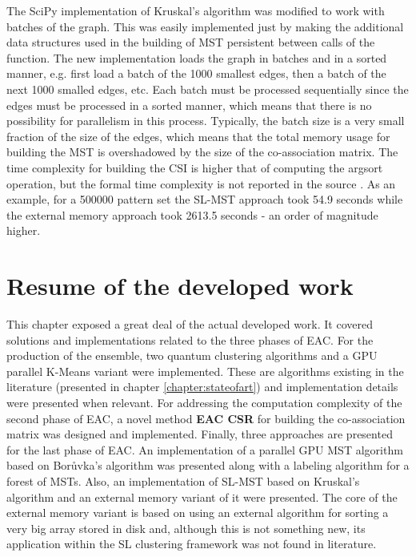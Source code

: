 The SciPy implementation of Kruskal's algorithm was modified to work with batches of the graph.
This was easily implemented just by making the additional data structures used in the building of MST persistent between calls of the function.
The new implementation loads the graph in batches and in a sorted manner, e.g. first load a batch of the 1000 smallest edges, then a batch of the next 1000 smalled edges, etc.
Each batch must be processed sequentially since the edges must be processed in a sorted manner, which means that there is no possibility for parallelism in this process.
Typically, the batch size is a very small fraction of the size of the edges, which means that the total memory usage for building the MST is overshadowed by the size of the co-association matrix.
The time complexity for building the CSI is higher that of computing the argsort operation, but the formal time complexity is not reported in the source \cite{AltetiAbad2007}.
As an example, for a 500000 pattern set the SL-MST approach took 54.9 seconds while the external memory approach took 2613.5 seconds - an order of magnitude higher.

\section{Resume of the developed work}

This chapter exposed a great deal of the actual developed work.
It covered solutions and implementations related to the three phases of EAC.
For the production of the ensemble, two quantum clustering algorithms and a GPU parallel K-Means variant were implemented.
These are algorithms existing in the literature (presented in chapter \ref{chapter:stateofart}) and implementation details were presented when relevant.
For addressing the computation complexity of the second phase of EAC, a novel method \textbf{EAC CSR} for building the co-association matrix was designed and implemented.
Finally, three approaches are presented for the last phase of EAC.
An implementation of a parallel GPU MST algorithm based on Borůvka's algorithm was presented along with a labeling algorithm for a forest of MSTs.
Also, an implementation of SL-MST based on Kruskal's algorithm and an external memory variant of it were presented.
The core of the external memory variant is based on using an external algorithm for sorting a very big array stored in disk and, although this is not something new, its application within the SL clustering framework was not found in literature.


